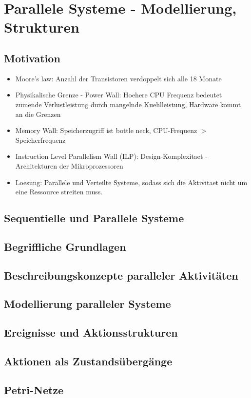 \chapter{Parallele Systeme - Modellierung, Strukturen}

\section{Motivation}

\begin{itemize}
	\setlength\itemsep{0em}
	\item Moore's law: Anzahl der Transistoren verdoppelt sich alle 18 Monate
	\item Physikalische Grenze - Power Wall: Hoehere CPU Frequenz bedeutet zumende Verlustleistung durch mangelnde Kuehlleistung, Hardware kommt an die Grenzen
	\item Memory Wall: Speicherzugriff ist bottle neck, CPU-Frequenz $>$ Speicherfrequenz
	\item Instruction Level Parallelism Wall (ILP): Design-Komplexitaet - Architekturen der Mikroprozessoren
	\item Loesung: Parallele und Verteilte Systeme, sodass sich die Aktivitaet nicht um eine Ressource streiten muss. 
\end{itemize}

\section{Sequentielle und Parallele Systeme}

\section{Begriffliche Grundlagen}

\section{Beschreibungskonzepte paralleler Aktivitäten}

\section{Modellierung paralleler Systeme}

\section{Ereignisse und Aktionsstrukturen}

\section{Aktionen als Zustandsübergänge}

\section{Petri-Netze}
